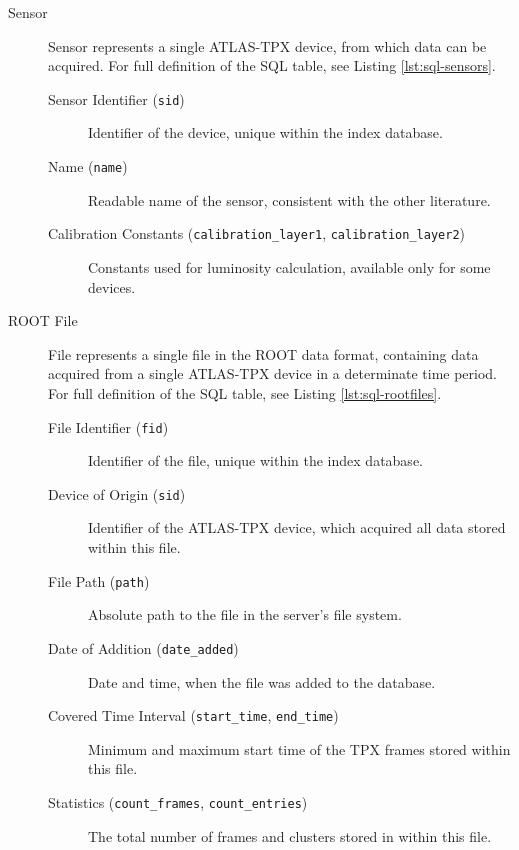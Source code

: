 
\label{db:definition}
\begin{description}
	\item[Sensor]
	Sensor represents a single ATLAS-TPX device, from which data can be acquired. For full definition of the SQL table, see Listing \ref{lst:sql-sensors}.

	\begin{description}
		\item[Sensor Identifier (\texttt{sid})]
		Identifier of the device, unique within the index database.

		\item[Name (\texttt{name})]
		Readable name of the sensor, consistent with the other literature.

		\item[Calibration Constants (\texttt{calibration\_layer1}, \texttt{calibration\_layer2})]
		Constants used for luminosity calculation, available only for some devices.
	\end{description}

	\item[ROOT File]
	File represents a single file in the ROOT data format, containing data acquired from a single ATLAS-TPX device in a determinate time period. For full definition of the SQL table, see Listing \ref{lst:sql-rootfiles}.

	\begin{description}
		\item[File Identifier (\texttt{fid})] 
		Identifier of the file, unique within the index database.

		\item[Device of Origin (\texttt{sid})]
		Identifier of the ATLAS-TPX device, which acquired all data stored within this file.

		\item[File Path (\texttt{path})] 
		Absolute path to the file in the server's file system.

		\item[Date of Addition (\texttt{date\_added})]
		Date and time, when the file was added to the database.

		\item[Covered Time Interval (\texttt{start\_time}, \texttt{end\_time})]
		Minimum and maximum start time of the TPX frames stored within this file.

		\item[Statistics (\texttt{count\_frames}, \texttt{count\_entries})]
		The total number of frames and clusters stored in within this file.


\end{description}
\end{description}
